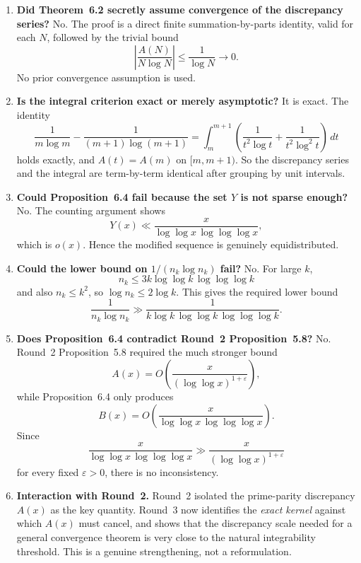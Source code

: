 \begin{enumerate}
\item \textbf{Did Theorem~6.2 secretly assume convergence of the discrepancy series?}
No.
The proof is a direct finite summation-by-parts identity, valid for each \(N\), followed by the trivial bound
\[
\left|\frac{A(N)}{N\log N}\right|\le \frac1{\log N}\to 0.
\]
No prior convergence assumption is used.

\item \textbf{Is the integral criterion exact or merely asymptotic?}
It is exact.
The identity
\[
\frac{1}{m\log m}-\frac{1}{(m+1)\log(m+1)}
=
\int_m^{m+1}\left(\frac{1}{t^2\log t}+\frac{1}{t^2\log^2 t}\right)\,dt
\]
holds exactly, and \(A(t)=A(m)\) on \([m,m+1)\).
So the discrepancy series and the integral are term-by-term identical after grouping by unit intervals.

\item \textbf{Could Proposition~6.4 fail because the set \(Y\) is not sparse enough?}
No.
The counting argument shows
\[
Y(x)\ll \frac{x}{\log\log x\,\log\log\log x},
\]
which is \(o(x)\).
Hence the modified sequence is genuinely equidistributed.

\item \textbf{Could the lower bound on \(1/(n_k\log n_k)\) fail?}
No.
For large \(k\),
\[
n_k\le 3k\log\log k\,\log\log\log k
\]
and also \(n_k\le k^2\), so \(\log n_k\le 2\log k\).
This gives the required lower bound
\[
\frac{1}{n_k\log n_k}
\gg
\frac{1}{k\log k\,\log\log k\,\log\log\log k}.
\]

\item \textbf{Does Proposition~6.4 contradict Round~2 Proposition~5.8?}
No.
Round~2 Proposition~5.8 required the much stronger bound
\[
A(x)=O\!\left(\frac{x}{(\log\log x)^{1+\varepsilon}}\right),
\]
while Proposition~6.4 only produces
\[
B(x)=O\!\left(\frac{x}{\log\log x\,\log\log\log x}\right).
\]
Since
\[
\frac{x}{\log\log x\,\log\log\log x}
\gg
\frac{x}{(\log\log x)^{1+\varepsilon}}
\]
for every fixed \(\varepsilon>0\), there is no inconsistency.

\item \textbf{Interaction with Round~2.}
Round~2 isolated the prime-parity discrepancy \(A(x)\) as the key quantity.
Round~3 now identifies the \emph{exact kernel} against which \(A(x)\) must cancel, and shows that the discrepancy scale needed for a general convergence theorem is very close to the natural integrability threshold.
This is a genuine strengthening, not a reformulation.
\end{enumerate}

